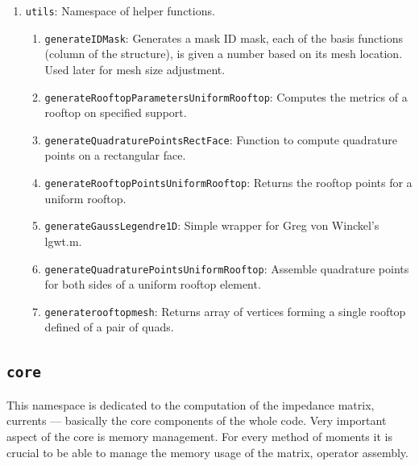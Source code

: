 \documentclass[9pt]{article}
\begin{document}
\begin{enumerate}[label=\Roman*.]
\begin{enumerate}[label=\roman*.]
            \item \texttt{weigths4D}: Obtain the weights for 4D integration.
            \item \texttt{weigths2D}: Obtain the weights for 2D integration.
            \item \texttt{points}: Returns pair of points, each one for one rectangle.
        \end{enumerate}
        \item \texttt{utils}: Namespace of helper functions.
        \begin{enumerate}[label=\roman*.]
            \item \texttt{generateIDMask}: Generates a mask ID mask, each of the basis functions (column of the structure), is given a number based on its mesh location. Used later for mesh size adjustment.
            \item \texttt{generateRooftopParametersUniformRooftop}: Computes the metrics of a rooftop on specified support.
            \item \texttt{generateQuadraturePointsRectFace}: Function to compute quadrature points on a rectangular face.
            \item \texttt{generateRooftopPointsUniformRooftop}: Returns the rooftop points for a uniform rooftop.
            \item \texttt{generateGaussLegendre1D}: Simple wrapper for Greg von Winckel’s lgwt.m.
            \item \texttt{generateQuadraturePointsUniformRooftop}: Assemble quadrature points for both sides of a uniform rooftop element.
            \item \texttt{generaterooftopmesh}: Returns array of vertices forming a single rooftop defined of a pair of quads.
        \end{enumerate}
    \end{enumerate}

    \subsection{\texttt{core}}

    This namespace is dedicated to the computation of the impedance matrix, currents --- basically the core components of the whole code. Very important aspect of the core is memory management. For every method of moments it is crucial to be able to manage the memory usage of the matrix, operator assembly.
\end{document}
